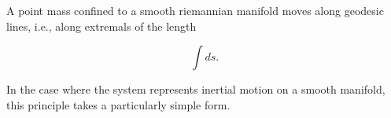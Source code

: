 A point mass confined to a smooth riemannian manifold moves along geodesic lines, i.e., along extremals of the length

$$\int ds.$$

In the case where the system represents inertial motion on a smooth manifold, this principle takes a particularly simple form.
